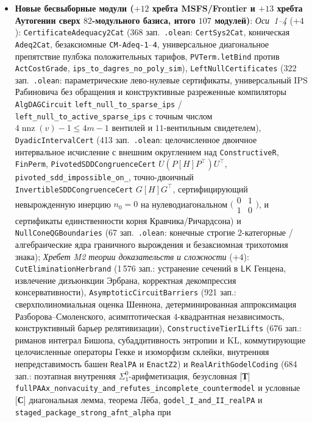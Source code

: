 \documentclass[11pt]{article}
\theoremstyle{plain}
\theoremstyle{definition}
\begin{document}
\begin{itemize}[nosep]
\item \textbf{Новые бесвыборные модули ($+12$ хребта MSFS/Frontier и $+13$ хребта Аутогении сверх $82$-модульного базиса, итого $107$ модулей)}: \emph{Оси~1--4} ($+4$): \texttt{Certificate\allowbreak Adequacy2Cat} (368 зап.\ \texttt{.olean}: \texttt{CertSys2Cat}, коническая \texttt{Adeq2Cat}, безаксиомные \texttt{CM-Adeq-1}--\texttt{4}, универсальное диагональное препятствие пулбэка положительных тарифов, \texttt{PVTerm.letBind} против \texttt{ActCostGrade}, \texttt{ips\_\allowbreak to\_\allowbreak dagres\_\allowbreak no\_\allowbreak poly\_\allowbreak sim}), \texttt{LeftNull\allowbreak Certificates} (322 зап.\ \texttt{.olean}: параметрические лево-нулевые сертификаты, универсальный $\mathrm{IPS}$ Рабиновича без обращения и конструктивные разреженные компиляторы \texttt{AlgDAGCircuit} \texttt{left\_\allowbreak null\_\allowbreak to\_\allowbreak sparse\_\allowbreak ips} / \texttt{left\_\allowbreak null\_\allowbreak to\_\allowbreak active\_\allowbreak sparse\_\allowbreak ips} с точным числом $4\operatorname{nnz}(v)-1 \le 4m-1$ вентилей и $11$-вентильным свидетелем), \texttt{Dyadic\allowbreak IntervalCert} (413 зап.\ \texttt{.olean}: целочисленное двоичное интервальное исчисление с внешним округлением над \texttt{ConstructiveR}, \texttt{FinPerm}, \texttt{PivotedSDDCongruenceCert} $U(P[H]P^\top)U^\top$, \texttt{pivoted\_\allowbreak sdd\_\allowbreak impossible\_\allowbreak on\_}, точно-двоичный \texttt{InvertibleSDDCongruenceCert} $G[H]G^\top$, сертифицирующий невырожденную инерцию $n_0=0$ на нулеводиагональном $\bigl(\begin{smallmatrix}0&1\\1&0\end{smallmatrix}\bigr)$, и сертификаты единственности корня Кравчика/Ричардсона) и \texttt{NullCone\allowbreak QGBoundaries} (67 зап.\ \texttt{.olean}: конечные строгие $2$-категорные / алгебраические ядра граничного вырождения и безаксиомная трихотомия знака); \emph{Хребет M2 теории доказательств и сложности} ($+4$): \texttt{CutElimination\allowbreak Herbrand} (1\,576 зап.: устранение сечений в $\mathsf{LK}$ Генцена, извлечение дизъюнкции Эрбрана, корректная декомпрессия консервативности), \texttt{Asymptotic\allowbreak CircuitBarriers} (921 зап.: сверхполиномиальная оценка Шеннона, детерминированная аппроксимация Разборова--Смоленского, асимптотическая $4$-квадрантная независимость, конструктивный барьер релятивизации), \texttt{Constructive\allowbreak TierILifts} (676 зап.: риманов интеграл Бишопа, субаддитивность энтропии и $\mathrm{KL}$, коммутирующие целочисленные операторы Гекке и изоморфизм склейки, внутренняя непредставимость башен \texttt{RealPA} и \texttt{EnactZ2}) и \texttt{RealArith\allowbreak GodelCoding} (684 зап.: поэтапная внутренняя $\Sigma^0_1$-арифметизация, безусловная \textup{[\textbf{Т}]} \texttt{fullPAAx\_\allowbreak nonvacuity\_\allowbreak and\_\allowbreak refutes\_\allowbreak incomplete\_\allowbreak countermodel} и условные \textup{[\textbf{С}]} диагональная лемма, теорема Лёба, \texttt{godel\_\allowbreak I\_\allowbreak and\_\allowbreak II\_\allowbreak realPA} и \texttt{staged\_\allowbreak package\_\allowbreak strong\_\allowbreak afnt\_\allowbreak alpha} при 
\end{itemize}
\end{document}
